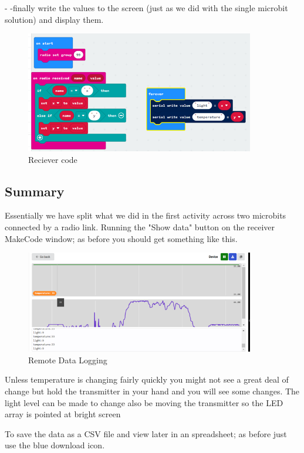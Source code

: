 -            -finally write the values to the screen (just as we did with the single microbit solution) and display them.

\begin{figure}
    \centering
    \includegraphics[width=10cm]{chapters/ChapterP2-datalog/figures/datalog11.png}
    \caption{Reciever code}
    \label{fig:datalogreciever}
\end{figure}
 
\subsection{Summary}

Essentially we have split what we did in the first activity across two microbits connected by a radio link. Running the "Show data" button on the receiver MakeCode window; as before you should get something like this.

\begin{figure}
    \centering
    \includegraphics[width=10cm]{chapters/ChapterP2-datalog/figures/datalog12.png}
    \caption{Remote Data Logging}
    \label{fig:datalogremotedatalogging}
\end{figure}
Unless temperature is changing fairly quickly you might not see a great deal of change but hold the transmitter in your hand and you will see some changes. The light level can be made to change also be moving the transmitter so the LED array is pointed at bright screen

 

To save the data as a CSV file and view later in an spreadsheet; as before just use the blue download icon.

